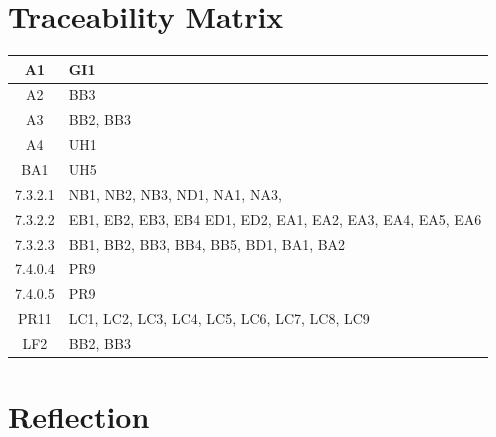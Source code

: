 \documentclass[12pt]{article}
\begin{document}
{\section{Traceability Matrix}

\begin{table}[H]
    \centering
        \setlength{\leftmargini}{0.4cm}
        \begin{tabularx}{\linewidth}{|c|X|}
        \hline
        A1 & GI1 \\
        \hline 
        A2 & BB3 \\ 
        \hline 
        A3 & BB2, BB3 \\
        \hline
        A4 & UH1 \\
        \hline
        BA1 & UH5 \\
        \hline
        7.3.2.1 & NB1,  NB2,  NB3,  ND1, NA1, NA3, \\
        \hline 
        7.3.2.2 & EB1, EB2, EB3, EB4 ED1, ED2, EA1, EA2, EA3, EA4, EA5, EA6\\
        \hline
        7.3.2.3 & BB1, BB2, BB3, BB4, BB5, BD1, BA1, BA2 \\
        \hline
        7.4.0.4 & PR9\\ 
        \hline
        7.4.0.5 & PR9\\
        \hline
        PR11 & LC1, LC2, LC3, LC4, LC5, LC6, LC7, LC8, LC9 \\
        \hline
        LF2 & BB2, BB3 \\ 
        \hline
        \end{tabularx}
    \label{Table}
    \end{table}
  
  

\appendix
\section{Reflection}

}
\end{document}
